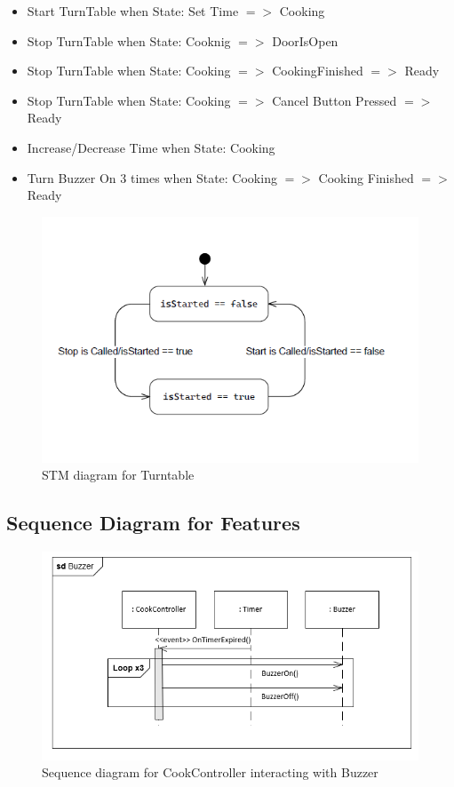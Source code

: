 \begin{itemize}
  \item Start TurnTable when State: Set Time $=>$ Cooking
  \item Stop TurnTable when State: Cooknig $=>$ DoorIsOpen
  \item Stop TurnTable when State: Cooking $=>$ CookingFinished $=>$ Ready
  \item Stop TurnTable when State: Cooking $=>$ Cancel Button Pressed $=>$ Ready
  \item Increase/Decrease Time when State: Cooking
  \item Turn Buzzer On 3 times when State: Cooking $=>$ Cooking Finished $=>$ Ready 
\end{itemize}

\newpage
\begin{figure}[h]
  \centering
  \includegraphics[scale=0.6]{02-Body/Image/TurntableSTM.PNG}
  \caption{STM diagram for Turntable}%
  \label{fig:TurntableSTM}
\end{figure}

\subsection{Sequence Diagram for Features}
\begin{figure}[h]
  \centering
  \includegraphics[scale=0.6]{02-Body/Image/BuzzerSEQ.PNG}
  \caption{Sequence diagram for CookController interacting with Buzzer}%
  \label{fig:BuzzerSeq}
\end{figure}

